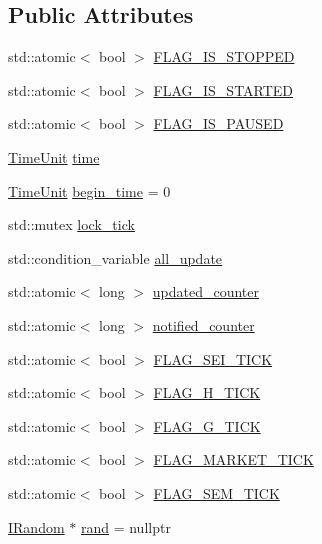 \subsection*{Public Attributes}
{\bf }\par
\begin{DoxyCompactItemize}
\item 
std\+::atomic$<$ bool $>$ \hyperlink{classsolar__core_1_1_w_a9bb998c65a7427961de179f41e25daea}{F\+L\+A\+G\+\_\+\+I\+S\+\_\+\+S\+T\+O\+P\+P\+E\+D}
\item 
std\+::atomic$<$ bool $>$ \hyperlink{classsolar__core_1_1_w_a8456f88d45f2e8bf67eccd7f0c8d08fa}{F\+L\+A\+G\+\_\+\+I\+S\+\_\+\+S\+T\+A\+R\+T\+E\+D}
\item 
std\+::atomic$<$ bool $>$ \hyperlink{classsolar__core_1_1_w_a1c0ebdba727a7a5cbf322072ab5c9184}{F\+L\+A\+G\+\_\+\+I\+S\+\_\+\+P\+A\+U\+S\+E\+D}
\item 
\hyperlink{namespacesolar__core_a4b5949d07259da6f8a20d12a30403e90}{Time\+Unit} \hyperlink{classsolar__core_1_1_w_ae96b30122adc9fae8fc2f209a4c89b0a}{time}
\item 
\hyperlink{namespacesolar__core_a4b5949d07259da6f8a20d12a30403e90}{Time\+Unit} \hyperlink{classsolar__core_1_1_w_aec1b9014ad296dc9b8b132ba9b67c08a}{begin\+\_\+time} = 0
\item 
std\+::mutex \hyperlink{classsolar__core_1_1_w_a56ba20ee51f5db7288e55bb65f12511b}{lock\+\_\+tick}
\item 
std\+::condition\+\_\+variable \hyperlink{classsolar__core_1_1_w_aa6cba0dba8a566978e51fb4204aac4b9}{all\+\_\+update}
\item 
std\+::atomic$<$ long $>$ \hyperlink{classsolar__core_1_1_w_a775d817c6117b462571c3fca62fe0c86}{updated\+\_\+counter}
\item 
std\+::atomic$<$ long $>$ \hyperlink{classsolar__core_1_1_w_afee32d515534826a60ddf12936f85a3d}{notified\+\_\+counter}
\item 
std\+::atomic$<$ bool $>$ \hyperlink{classsolar__core_1_1_w_a65d2047e574ed6201a8e21ec1ba1bec4}{F\+L\+A\+G\+\_\+\+S\+E\+I\+\_\+\+T\+I\+C\+K}
\item 
std\+::atomic$<$ bool $>$ \hyperlink{classsolar__core_1_1_w_a4cd32940e21bfc20919cc2d4447d66d3}{F\+L\+A\+G\+\_\+\+H\+\_\+\+T\+I\+C\+K}
\item 
std\+::atomic$<$ bool $>$ \hyperlink{classsolar__core_1_1_w_aae63ce0d440f2c8d475d6eeafac58238}{F\+L\+A\+G\+\_\+\+G\+\_\+\+T\+I\+C\+K}
\item 
std\+::atomic$<$ bool $>$ \hyperlink{classsolar__core_1_1_w_a7aa8b882244539e098e45207045d7d88}{F\+L\+A\+G\+\_\+\+M\+A\+R\+K\+E\+T\+\_\+\+T\+I\+C\+K}
\item 
std\+::atomic$<$ bool $>$ \hyperlink{classsolar__core_1_1_w_ae383b7a595cb28d52aa747fc7e5bb619}{F\+L\+A\+G\+\_\+\+S\+E\+M\+\_\+\+T\+I\+C\+K}
\item 
\hyperlink{classsolar__core_1_1_i_random}{I\+Random} $\ast$ \hyperlink{classsolar__core_1_1_w_aa60afb55012cd72e304ac2c133e5a245}{rand} = nullptr
\end{DoxyCompactItemize}

